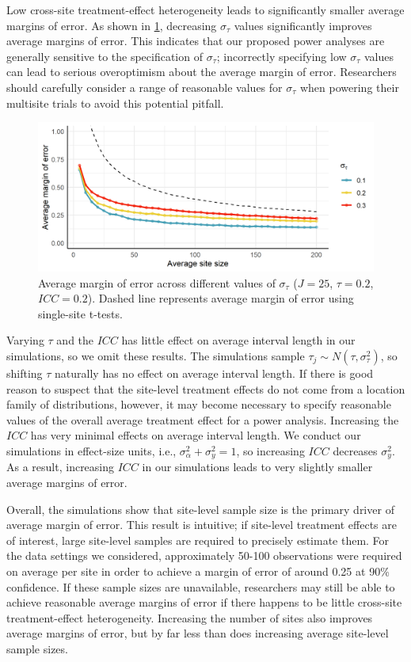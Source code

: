 \documentclass[]{article}
\begin{document}
Low cross-site treatment-effect heterogeneity leads to significantly smaller average margins of error.
As shown in \ref{fig:results_txsd}, decreasing $\sigma_\tau$ values significantly improves average margins of error.
This indicates that our proposed power analyses are generally sensitive to the specification of $\sigma_\tau$;
incorrectly specifying low $\sigma_\tau$ values can lead to serious overoptimism about the average margin of error.
Researchers should carefully consider a range of reasonable values for $\sigma_\tau$ when powering their multisite trials to avoid this potential pitfall.
\begin{figure}[ht]
	\centering
	\includegraphics[width=\textwidth]{simstudy_txsd_length}
	\caption{Average margin of error across different values of $\sigma_\tau$ ($J=25$, $\tau=0.2$, $ICC=0.2$).
	    Dashed line represents average margin of error using single-site t-tests.}
	\label{fig:results_txsd}
\end{figure}

Varying $\tau$ and the $ICC$ has little effect on average interval length in our simulations, so we omit these results.
The simulations sample $\tau_j \sim N(\tau, \sigma_\tau^2)$, so shifting $\tau$ naturally has no effect on average interval length.
If there is good reason to suspect that the site-level treatment effects do not come from a location family of distributions, however, it may become necessary to specify reasonable values of the overall average treatment effect for a power analysis.
Increasing the $ICC$ has very minimal effects on average interval length.
We conduct our simulations in effect-size units, i.e., $\sigma^2_\alpha + \sigma^2_y = 1$, so increasing $ICC$ decreases $\sigma^2_y$.
As a result, increasing $ICC$ in our simulations leads to very slightly smaller average margins of error.

Overall, the simulations show that site-level sample size is the primary driver of average margin of error.
This result is intuitive; if site-level treatment effects are of interest, large site-level samples are required to precisely estimate them.
For the data settings we considered, approximately 50-100 observations were required on average per site in order to achieve a margin of error of around 0.25 at 90\% confidence.
If these sample sizes are unavailable, researchers may still be able to achieve reasonable average margins of error if there happens to be little cross-site treatment-effect heterogeneity.
Increasing the number of sites also improves average margins of error, but by far less than does increasing average site-level sample sizes.
\end{document}
